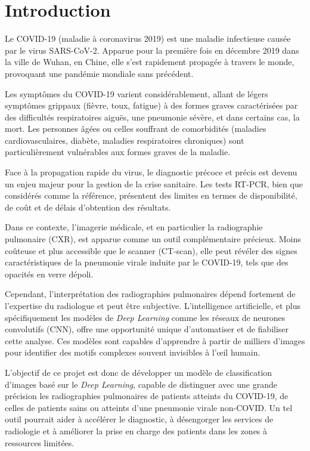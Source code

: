 \section{Introduction}
\label{sec:introduction}

Le COVID-19 (maladie à coronavirus 2019) est une maladie infectieuse causée par le virus SARS-CoV-2. Apparue pour la première fois en décembre 2019 dans la ville de Wuhan, en Chine, elle s'est rapidement propagée à travers le monde, provoquant une pandémie mondiale sans précédent.

Les symptômes du COVID-19 varient considérablement, allant de légers symptômes grippaux (fièvre, toux, fatigue) à des formes graves caractérisées par des difficultés respiratoires aiguës, une pneumonie sévère, et dans certains cas, la mort. Les personnes âgées ou celles souffrant de comorbidités (maladies cardiovasculaires, diabète, maladies respiratoires chroniques) sont particulièrement vulnérables aux formes graves de la maladie.

Face à la propagation rapide du virus, le diagnostic précoce et précis est devenu un enjeu majeur pour la gestion de la crise sanitaire. Les tests RT-PCR, bien que considérés comme la référence, présentent des limites en termes de disponibilité, de coût et de délais d'obtention des résultats.

Dans ce contexte, l'imagerie médicale, et en particulier la radiographie pulmonaire (CXR), est apparue comme un outil complémentaire précieux. Moins coûteuse et plus accessible que le scanner (CT-scan), elle peut révéler des signes caractéristiques de la pneumonie virale induite par le COVID-19, tels que des opacités en verre dépoli.

Cependant, l'interprétation des radiographies pulmonaires dépend fortement de l'expertise du radiologue et peut être subjective. L'intelligence artificielle, et plus spécifiquement les modèles de \emph{Deep Learning} comme les réseaux de neurones convolutifs (CNN), offre une opportunité unique d'automatiser et de fiabiliser cette analyse. Ces modèles sont capables d'apprendre à partir de milliers d'images pour identifier des motifs complexes souvent invisibles à l'œil humain.

L'objectif de ce projet est donc de développer un modèle de classification d'images basé sur le \emph{Deep Learning}, capable de distinguer avec une grande précision les radiographies pulmonaires de patients atteints du COVID-19, de celles de patients sains ou atteints d'une pneumonie virale non-COVID. Un tel outil pourrait aider à accélérer le diagnostic, à désengorger les services de radiologie et à améliorer la prise en charge des patients dans les zones à ressources limitées.
